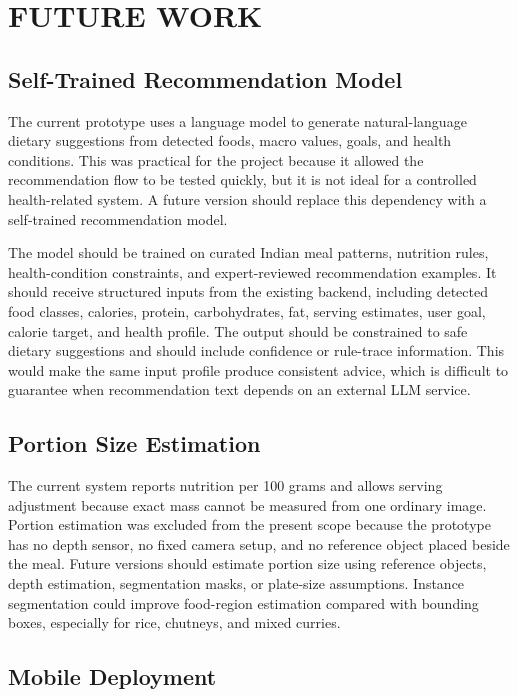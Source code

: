 \chapter{FUTURE WORK}

\section{Self-Trained Recommendation Model}

The current prototype uses a language model to generate natural-language dietary suggestions from detected foods, macro values, goals, and health conditions. This was practical for the project because it allowed the recommendation flow to be tested quickly, but it is not ideal for a controlled health-related system. A future version should replace this dependency with a self-trained recommendation model.

The model should be trained on curated Indian meal patterns, nutrition rules, health-condition constraints, and expert-reviewed recommendation examples. It should receive structured inputs from the existing backend, including detected food classes, calories, protein, carbohydrates, fat, serving estimates, user goal, calorie target, and health profile. The output should be constrained to safe dietary suggestions and should include confidence or rule-trace information. This would make the same input profile produce consistent advice, which is difficult to guarantee when recommendation text depends on an external LLM service.

\section{Portion Size Estimation}

The current system reports nutrition per 100 grams and allows serving adjustment because exact mass cannot be measured from one ordinary image. Portion estimation was excluded from the present scope because the prototype has no depth sensor, no fixed camera setup, and no reference object placed beside the meal. Future versions should estimate portion size using reference objects, depth estimation, segmentation masks, or plate-size assumptions. Instance segmentation could improve food-region estimation compared with bounding boxes, especially for rice, chutneys, and mixed curries.

\section{Mobile Deployment}

